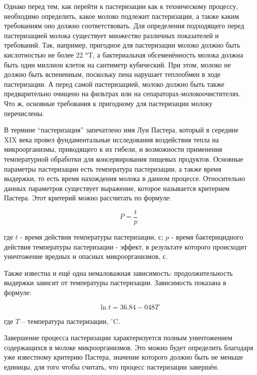 Однако перед тем, как перейти к пастеризации как к техническому процессу, необходимо определить, какое молоко подлежит пастеризации, а также каким требованиям оно должно соответствовать. Для определения подходящего перед пастеризацией молока существует множество различных показателей и требований. Так, например, пригодное для пастеризации молоко должно быть кислотностью не более 22 °T, а бактериальная обсеменённость молока должна быть один миллион клеток на сантиметр кубический. При этом, молоко не должно быть вспененным, поскольку пена нарушает теплообмен в ходе пастеризации. А перед самой пастеризацией, молоко должно быть также предварительно очищено на фильтрах или на сепараторах-молокоочистителях. Что ж, основные требования к пригодному для пастеризации молоку перечислены.

В термине “пастеризация” запечатлено имя Луи Пастера, который в середине XIX века провел фундаментальные исследования воздействия тепла на микроорганизмы, приводящего к их гибели, и возможности применения температурной обработки для консервирования пищевых продуктов. Основные параметры пастеризации есть температура пастеризации, а также время выдержки, то есть время нахождения молока в данном процессе. Относительно данных параметров существует выражение, которое называется критерием Пастера. Этот критерий можно рассчитать по формуле:

\begin{equation}
    P=\frac{t}{p}
\end{equation}

где $t$ - время действия температуры пастеризации, с; $p$ - время бактерицидного действия температуры пастеризации - эффект, в результате которого происходит уничтожение вредных и опасных микроорганизмов, с.

Также известна и ещё одна немаловажная зависимость: продолжительность выдержки зависит от температуры пастеризации. Зависимость показана в формуле:

\begin{equation}
    \ln{t} = 36.84 - 048T
\end{equation}

где $T$ {--} температура пастеризации, $^{\circ}$C.

Завершение процесса пастеризации характеризуется полным уничтожением содержащихся в молоке микроорганизмов. Это можно будет определить благодаря уже известному критерию Пастера, значение которого должно быть не меньше единицы, для того чтобы считать, что процесс пастеризации завершён.

